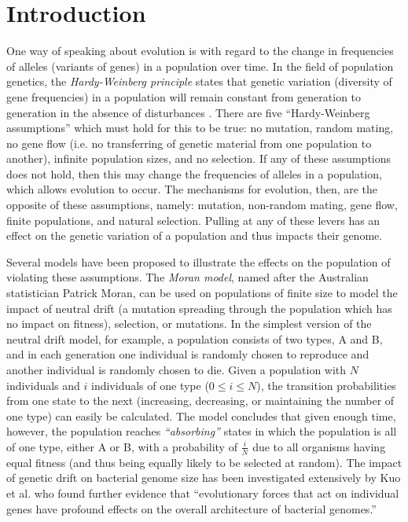 \chapter{Introduction}\label{ch:intro}

One way of speaking about evolution is with regard to the change in frequencies of alleles (variants of genes) in a population over time. In the field of population genetics, the \textit{Hardy-Weinberg principle} states that genetic variation (diversity of gene frequencies) in a population will remain constant from generation to generation in the absence of disturbances \cite{cutter2019primer}. There are five ``Hardy-Weinberg assumptions'' which must hold for this to be true: no mutation, random mating, no gene flow (i.e. no transferring of genetic material from one population to another), infinite population sizes, and no selection. If any of these assumptions does not hold, then this may change the frequencies of alleles in a population, which allows evolution to occur. The mechanisms for evolution, then, are the opposite of these assumptions, namely: mutation, non-random mating, gene flow, finite populations, and natural selection. Pulling at any of these levers has an effect on the genetic variation of a population and thus impacts their genome. 

Several models have been proposed to illustrate the effects on the population of violating these assumptions. The \textit{Moran model}, named after the Australian statistician Patrick Moran, can be used on populations of finite size to model the impact of neutral drift (a mutation spreading through the population which has no impact on fitness), selection, or mutations. In the simplest version of the neutral drift model, for example, a population consists of two types, A and B, and in each generation one individual is randomly chosen to reproduce and another individual is randomly chosen to die. Given a population with $N$ individuals and $i$ individuals of one type ($0 \leq i \leq N$), the transition probabilities from one state to the next (increasing, decreasing, or maintaining the number of one type) can easily be calculated. The model concludes that given enough time, however, the population reaches \textit{``absorbing''} states in which the population is all of one type, either A or B, with a probability of $\frac{i}{N}$ due to all organisms having equal fitness (and thus being equally likely to be selected at random). The impact of genetic drift on bacterial genome size has been investigated extensively by Kuo et al. \cite{kuo2009consequences} who found further evidence that ``evolutionary forces that act on individual genes have profound effects on the overall architecture of bacterial genomes.'' 

